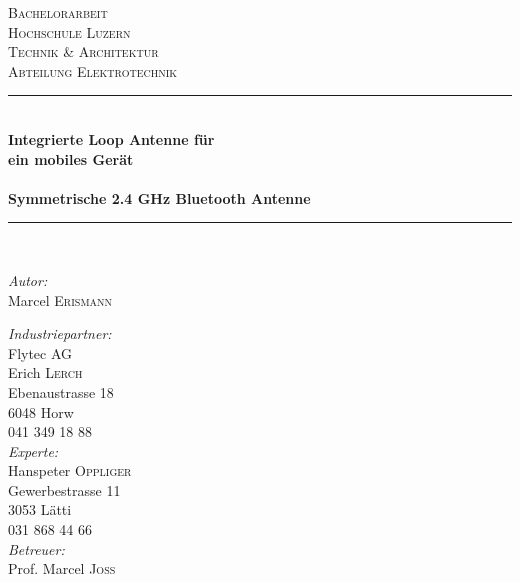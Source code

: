 \begin{titlepage}

\begin{center}

\textsc{\LARGE Bachelorarbeit}\\[1.5cm]

\textsc{ \Large Hochschule Luzern\\
    Technik \& Architektur\\
    Abteilung Elektrotechnik}\\[0.5cm]

\vfill{}

\newcommand{\HRule}{\rule{\linewidth}{0.5mm}}
\HRule \\[0.4cm]
{   \Huge \bfseries Integrierte Loop Antenne für \\ein mobiles Gerät\\
        ~\\
        \large Symmetrische 2.4 GHz Bluetooth Antenne}\\[0.4cm]

\HRule \\[1.5cm]

\begin{minipage}{0.4\textwidth}
    \begin{flushleft} \large
        \emph{Autor:}\\
        Marcel \textsc{Erismann}\\
    \end{flushleft}
\end{minipage}
\hfill
\begin{minipage}{0.4\textwidth}
    \begin{flushright} \large
          \emph{Industriepartner:} \\
         Flytec AG\\
         Erich \textsc{Lerch}\\
         Ebenaustrasse 18 \\
         6048 Horw\\
		041 349 18 88\\
         \vspace{0.5cm}
         \emph{Experte:} \\
         Hanspeter  \textsc{Oppliger}\\
         Gewerbestrasse 11\\
		3053 Lätti\\
 		031 868 44 66\\
         \vspace{0.5cm}
         \emph{Betreuer:} \\
         Prof. Marcel  \textsc{Joss}
    \end{flushright}
\end{minipage}


\end{center}
\end{titlepage}
